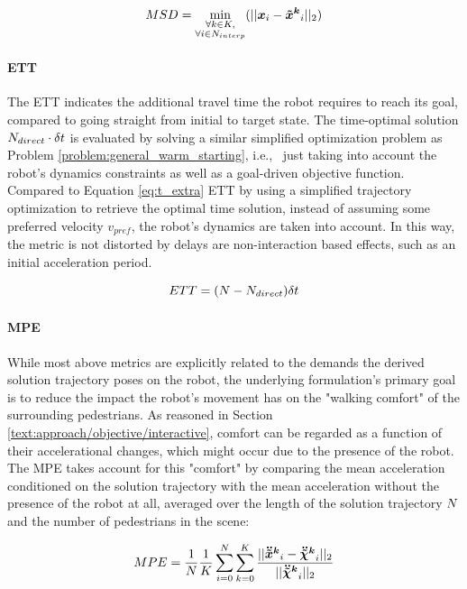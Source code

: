 \begin{equation}
MSD = \min_{\substack{\forall k \in K, \\ \forall i \in \stepssolution_{interp}}}(||\x_i - \xped[k]_i||_2) 
\end{equation}

\paragraph{\ac{ETT}}
The \ac{ETT} indicates the additional travel time the robot requires to reach its goal, compared to going straight from initial to target state. The time-optimal solution $N_{direct} \cdot \delta t$ is evaluated by solving a similar simplified optimization problem as Problem \ref{problem:general_warm_starting}, i.e., \ just taking into account the robot's dynamics constraints as well as a goal-driven objective function. Compared to Equation \ref{eq:t_extra} \ac{ETT} by using a simplified trajectory optimization to retrieve the optimal time solution, instead of assuming some preferred velocity $v_{pref}$, the robot's dynamics are taken into account. In this way, the metric is not distorted by delays are non-interaction based effects, such as an initial acceleration period.  

\begin{equation}
ETT = (N - N_{direct})\delta t
\end{equation}

\paragraph{\ac{MPE}}
While most above metrics are explicitly related to the demands the derived solution trajectory poses on the robot, the underlying formulation's primary goal is to reduce the impact the robot's movement has on the "walking comfort" of the surrounding pedestrians. As reasoned in Section \ref{text:approach/objective/interactive}, comfort can be regarded as a function of their accelerational changes, which might occur due to the presence of the robot. The MPE takes account for this "comfort" by comparing the mean acceleration conditioned on the solution trajectory with the mean acceleration without the presence of the robot at all, averaged over the length of the solution trajectory $N$ and the number of pedestrians in the scene:

\begin{equation}
MPE = \frac{1}{\stepssolution} \frac{1}{K} \sum_{i=0}^{\stepssolution} \sum_{k=0}^K \frac{||\ddxped[k]_i - \ddxpedwo[k]_i||_2}{||\ddxpedwo[k]_i||_2}
\end{equation}

